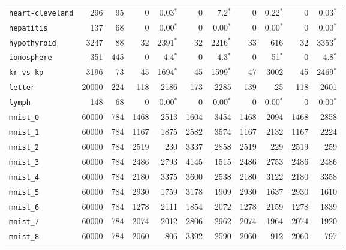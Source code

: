 \begin{tabular}{lccrrrrrrrr}
\texttt{heart-cleveland} & \multicolumn{1}{r}{296} & \multicolumn{1}{r}{95}  & 0 & 0.03$^*$ & 0 & 7.2$^*$ & 0 & 0.22$^*$ & 0 & 0.03$^*$\\
\texttt{hepatitis} & \multicolumn{1}{r}{137} & \multicolumn{1}{r}{68}  & 0 & 0.00$^*$ & 0 & 0.00$^*$ & 0 & 0.00$^*$ & 0 & 0.00$^*$\\
\texttt{hypothyroid} & \multicolumn{1}{r}{3247} & \multicolumn{1}{r}{88}  & 32 & 2391$^*$ & 32 & 2216$^*$ & 33 & 616 & 32 & 3353$^*$\\
\texttt{ionosphere} & \multicolumn{1}{r}{351} & \multicolumn{1}{r}{445}  & 0 & 4.4$^*$ & 0 & 4.3$^*$ & 0 & 51$^*$ & 0 & 4.8$^*$\\
\texttt{kr-vs-kp} & \multicolumn{1}{r}{3196} & \multicolumn{1}{r}{73}  & 45 & 1694$^*$ & 45 & 1599$^*$ & 47 & 3002 & 45 & 2469$^*$\\
\texttt{letter} & \multicolumn{1}{r}{20000} & \multicolumn{1}{r}{224}  & 118 & 2186 & 173 & 2285 & 139 & 25 & 118 & 2601\\
\texttt{lymph} & \multicolumn{1}{r}{148} & \multicolumn{1}{r}{68}  & 0 & 0.00$^*$ & 0 & 0.00$^*$ & 0 & 0.00$^*$ & 0 & 0.00$^*$\\
\texttt{mnist\_0} & \multicolumn{1}{r}{60000} & \multicolumn{1}{r}{784}  & 1468 & 2513 & 1604 & 3454 & 1468 & 2094 & 1468 & 2858\\
\texttt{mnist\_1} & \multicolumn{1}{r}{60000} & \multicolumn{1}{r}{784}  & 1167 & 1875 & 2582 & 3574 & 1167 & 2132 & 1167 & 2224\\
\texttt{mnist\_2} & \multicolumn{1}{r}{60000} & \multicolumn{1}{r}{784}  & 2519 & 230 & 3337 & 2858 & 2519 & 229 & 2519 & 259\\
\texttt{mnist\_3} & \multicolumn{1}{r}{60000} & \multicolumn{1}{r}{784}  & 2486 & 2793 & 4145 & 1515 & 2486 & 2753 & 2486 & 2486\\
\texttt{mnist\_4} & \multicolumn{1}{r}{60000} & \multicolumn{1}{r}{784}  & 2180 & 3375 & 3600 & 2538 & 2180 & 3122 & 2180 & 3358\\
\texttt{mnist\_5} & \multicolumn{1}{r}{60000} & \multicolumn{1}{r}{784}  & 2930 & 1759 & 3178 & 1909 & 2930 & 1637 & 2930 & 1610\\
\texttt{mnist\_6} & \multicolumn{1}{r}{60000} & \multicolumn{1}{r}{784}  & 1278 & 2111 & 1854 & 2072 & 1278 & 2159 & 1278 & 1839\\
\texttt{mnist\_7} & \multicolumn{1}{r}{60000} & \multicolumn{1}{r}{784}  & 2074 & 2012 & 2806 & 2962 & 2074 & 1964 & 2074 & 1920\\
\texttt{mnist\_8} & \multicolumn{1}{r}{60000} & \multicolumn{1}{r}{784}  & 2060 & 806 & 3392 & 2590 & 2060 & 912 & 2060 & 797\\

\end{tabular}
